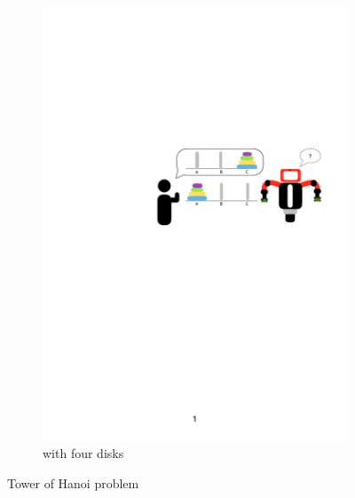 \begin{figure}[htp]
\begin{subfigure}[t]{0.45\textwidth}
	\includegraphics[width=\textwidth]{figures/hanoi-1}
	\caption{with four disks}
	\label{fig:Tower of Hanoi 4}
\end{subfigure}
	
	\caption{Tower of Hanoi problem}
	\label{fig:Tower of Hanoi}
\end{figure}

